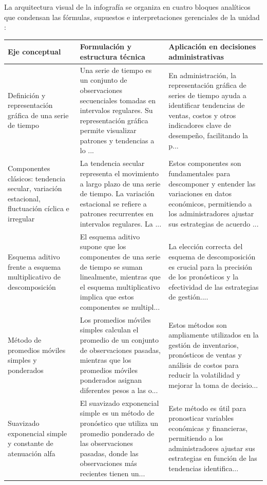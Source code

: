{La arquitectura visual de la infografía se organiza en cuatro bloques analíticos que condensan las fórmulas, supuestos e interpretaciones gerenciales de la unidad \citep{anderson2012,hyndmanForecasting2021}:

\begin{center}
\renewcommand{\arraystretch}{1.25}
\begin{tabular}{p{3.6cm}p{5.2cm}p{5.8cm}}
\hline
\textbf{Eje conceptual} & \textbf{Formulación y estructura técnica} & \textbf{Aplicación en decisiones administrativas}\\\hline
Definición y representación gráfica de una serie de tiempo & Una serie de tiempo es un conjunto de observaciones secuenciales tomadas en intervalos regulares. Su representación gráfica permite visualizar patrones y tendencias a lo ... & En administración, la representación gráfica de series de tiempo ayuda a identificar tendencias de ventas, costos y otros indicadores clave de desempeño, facilitando la p...\\\hline
Componentes clásicos: tendencia secular, variación estacional, fluctuación cíclica e irregular & La tendencia secular representa el movimiento a largo plazo de una serie de tiempo. La variación estacional se refiere a patrones recurrentes en intervalos regulares. La ... & Estos componentes son fundamentales para descomponer y entender las variaciones en datos económicos, permitiendo a los administradores ajustar sus estrategias de acuerdo ...\\\hline
Esquema aditivo frente a esquema multiplicativo de descomposición & El esquema aditivo supone que los componentes de una serie de tiempo se suman linealmente, mientras que el esquema multiplicativo implica que estos componentes se multipl... & La elección correcta del esquema de descomposición es crucial para la precisión de los pronósticos y la efectividad de las estrategias de gestión....\\\hline
Método de promedios móviles simples y ponderados & Los promedios móviles simples calculan el promedio de un conjunto de observaciones pasadas, mientras que los promedios móviles ponderados asignan diferentes pesos a las o... & Estos métodos son ampliamente utilizados en la gestión de inventarios, pronósticos de ventas y análisis de costos para reducir la volatilidad y mejorar la toma de decisio...\\\hline
Suavizado exponencial simple y constante de atenuación alfa & El suavizado exponencial simple es un método de pronóstico que utiliza un promedio ponderado de las observaciones pasadas, donde las observaciones más recientes tienen un... & Este método es útil para pronosticar variables económicas y financieras, permitiendo a los administradores ajustar sus estrategias en función de las tendencias identifica...\\\hline

\end{tabular}
\end{center}}
